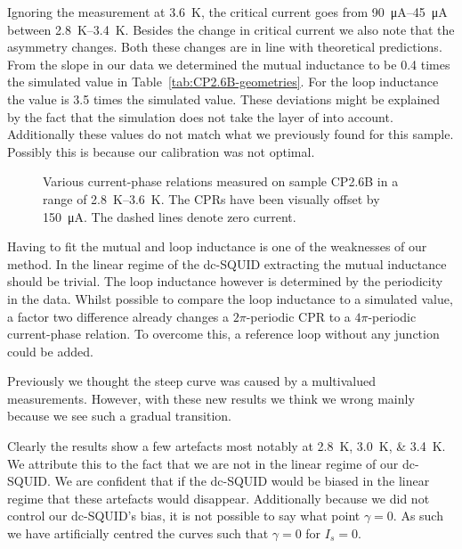 Ignoring the measurement at \qty{3.6}{\kelvin}, the critical current goes from \qtyrange{90}{45}{\micro\ampere} between \qtyrange{2.8}{3.4}{\kelvin}. Besides the change in critical current we also note that the asymmetry changes. Both these changes are in line with theoretical predictions\cite{likharevSuperconductingWeakLinks1979}. From the slope in our data we determined the mutual inductance to be 0.4 times the simulated value in Table~\ref{tab:CP2.6B-geometries}. For the loop inductance the value is 3.5 times the simulated value. These deviations might be explained by the fact that the simulation does not take the layer of  into account. Additionally these values do not match what we previously found for this sample. Possibly this is because our calibration was not optimal.

\begin{figure}[ht!]
	\centering
	
	\caption{Various current-phase relations measured on sample CP2.6B in a range of \qtyrange{2.8}{3.6}{\kelvin}. The CPRs have been visually offset by \qty{150}{\micro\ampere}. The dashed lines denote zero current.}
	\label{fig:CP2.6B_revisited_CPRs}
\end{figure}

Having to fit the mutual and loop inductance is one of the weaknesses of our method. In the linear regime of the dc-SQUID extracting the mutual inductance should be trivial. The loop inductance however is determined by the periodicity in the data. Whilst possible to compare the loop inductance to a simulated value, a factor two difference already changes a $2\pi$-periodic CPR to a $4\pi$-periodic current-phase relation. To overcome this, a reference loop without any junction could be added.

Previously we thought the steep curve was caused by a multivalued measurements. However, with these new results we think we wrong mainly because we see such a gradual transition.

Clearly the results show a few artefacts most notably at \qtylist{2.8;3.0;3.4}{\kelvin}. We attribute this to the fact that we are not in the linear regime of our dc-SQUID. We are confident that if the dc-SQUID would be biased in the linear regime that these artefacts would disappear. Additionally because we did not control our dc-SQUID's bias, it is not possible to say what point $\gamma = 0$. As such we have artificially centred the curves such that $\gamma = 0$ for $I_s=0$.
